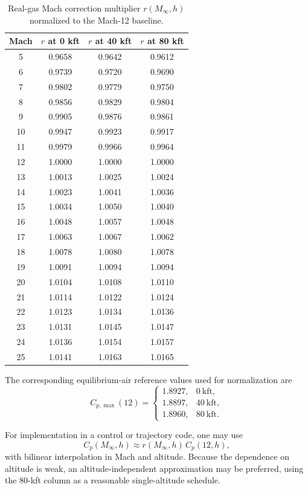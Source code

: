 \begin{table}[h!]
\centering
\caption{Real-gas Mach correction multiplier \(r(M_\infty,h)\) normalized to the Mach-12 baseline.}\label{tab:realgascorrection}
\begin{tabular}{c|ccc}
\hline
Mach & \(r\) at 0 kft & \(r\) at 40 kft & \(r\) at 80 kft \\
\hline
5  & 0.9658 & 0.9642 & 0.9612 \\
6  & 0.9739 & 0.9720 & 0.9690 \\
7  & 0.9802 & 0.9779 & 0.9750 \\
8  & 0.9856 & 0.9829 & 0.9804 \\
9  & 0.9905 & 0.9876 & 0.9861 \\
10 & 0.9947 & 0.9923 & 0.9917 \\
11 & 0.9979 & 0.9966 & 0.9964 \\
12 & 1.0000 & 1.0000 & 1.0000 \\
13 & 1.0013 & 1.0025 & 1.0024 \\
14 & 1.0023 & 1.0041 & 1.0036 \\
15 & 1.0034 & 1.0050 & 1.0040 \\
16 & 1.0048 & 1.0057 & 1.0048 \\
17 & 1.0063 & 1.0067 & 1.0062 \\
18 & 1.0078 & 1.0080 & 1.0078 \\
19 & 1.0091 & 1.0094 & 1.0094 \\
20 & 1.0104 & 1.0108 & 1.0110 \\
21 & 1.0114 & 1.0122 & 1.0124 \\
22 & 1.0123 & 1.0134 & 1.0136 \\
23 & 1.0131 & 1.0145 & 1.0147 \\
24 & 1.0136 & 1.0154 & 1.0157 \\
25 & 1.0141 & 1.0163 & 1.0165 \\
\hline
\end{tabular}
\end{table}

The corresponding equilibrium-air reference values used for normalization are
\[
C_{p,\max}(12)=
\begin{cases}
1.8927, & 0\ \text{kft},\\
1.8897, & 40\ \text{kft},\\
1.8960, & 80\ \text{kft}.
\end{cases}
\]

For implementation in a control or trajectory code, one may use
\begin{equation}
C_p(M_\infty,h)\approx r(M_\infty,h)\,C_p(12,h),
\end{equation}
with bilinear interpolation in Mach and altitude. Because the dependence on altitude is weak, an altitude-independent approximation may be preferred, using the \(80\)-kft column as a reasonable single-altitude schedule.

